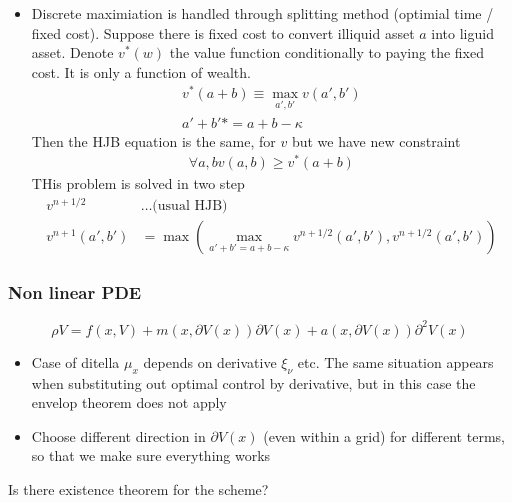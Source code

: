 \documentclass[english]{article}
\begin{document}
\begin{itemize}
	\item  Discrete maximiation is handled through splitting method (optimial time / fixed cost).	Suppose there is fixed cost to convert illiquid asset $a$ into liguid asset.	Denote $v^*(w)$ the value function conditionally to paying the fixed cost. It is only a function of wealth.
	\begin{align*}
		v^*(a+b) \equiv \max_{a', b'} v(a', b') \\
		a' + b' * = a + b - \kappa
	\end{align*}
	Then the HJB equation is the same, for $v$ but we have new constraint
	\begin{align*}
		\forall a, b	v(a, b) \geq v^*(a + b)
	\end{align*}
	THis problem is solved in two step
	\begin{align*}
		v^{n+1/2} &\dots \text{(usual HJB)}\\
		v^{n+1}(a', b') &= \max(\max_{a' + b' = a + b - \kappa} v^{n+1/2} (a', b'), v^{n+1/2}(a', b'))
	\end{align*}
\end{itemize}

\subsubsection{Non linear PDE}
$$\rho V = f(x, V) + m(x, \partial V(x)) \partial V(x)+ a(x, \partial V(x)) \partial^2 V(x)$$

\begin{itemize}
	\item Case of ditella $\mu_x$ depends on derivative $\xi_\nu$ etc. The same situation appears when substituting out optimal control by derivative, but in this case the envelop theorem does not apply
	\item Choose different direction in $\partial V(x)$ (even within a grid) for different terms, so that we make sure everything works
\end{itemize}
Is there existence theorem for the scheme?
\end{document}
